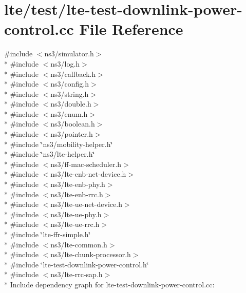 \hypertarget{lte-test-downlink-power-control_8cc}{}\section{lte/test/lte-\/test-\/downlink-\/power-\/control.cc File Reference}
\label{lte-test-downlink-power-control_8cc}
{\ttfamily \#include $<$ns3/simulator.\+h$>$}\\*
{\ttfamily \#include $<$ns3/log.\+h$>$}\\*
{\ttfamily \#include $<$ns3/callback.\+h$>$}\\*
{\ttfamily \#include $<$ns3/config.\+h$>$}\\*
{\ttfamily \#include $<$ns3/string.\+h$>$}\\*
{\ttfamily \#include $<$ns3/double.\+h$>$}\\*
{\ttfamily \#include $<$ns3/enum.\+h$>$}\\*
{\ttfamily \#include $<$ns3/boolean.\+h$>$}\\*
{\ttfamily \#include $<$ns3/pointer.\+h$>$}\\*
{\ttfamily \#include \char`\"{}ns3/mobility-\/helper.\+h\char`\"{}}\\*
{\ttfamily \#include \char`\"{}ns3/lte-\/helper.\+h\char`\"{}}\\*
{\ttfamily \#include $<$ns3/ff-\/mac-\/scheduler.\+h$>$}\\*
{\ttfamily \#include $<$ns3/lte-\/enb-\/net-\/device.\+h$>$}\\*
{\ttfamily \#include $<$ns3/lte-\/enb-\/phy.\+h$>$}\\*
{\ttfamily \#include $<$ns3/lte-\/enb-\/rrc.\+h$>$}\\*
{\ttfamily \#include $<$ns3/lte-\/ue-\/net-\/device.\+h$>$}\\*
{\ttfamily \#include $<$ns3/lte-\/ue-\/phy.\+h$>$}\\*
{\ttfamily \#include $<$ns3/lte-\/ue-\/rrc.\+h$>$}\\*
{\ttfamily \#include \char`\"{}lte-\/ffr-\/simple.\+h\char`\"{}}\\*
{\ttfamily \#include $<$ns3/lte-\/common.\+h$>$}\\*
{\ttfamily \#include $<$ns3/lte-\/chunk-\/processor.\+h$>$}\\*
{\ttfamily \#include \char`\"{}lte-\/test-\/downlink-\/power-\/control.\+h\char`\"{}}\\*
{\ttfamily \#include $<$ns3/lte-\/rrc-\/sap.\+h$>$}\\*
Include dependency graph for lte-\/test-\/downlink-\/power-\/control.cc\+:

